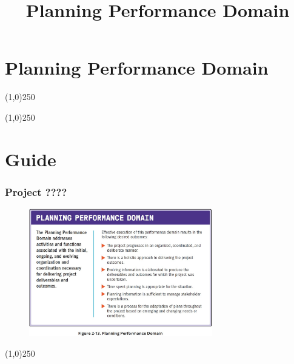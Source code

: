 



%
\title[Project Management \& BIM]{Planning Performance Domain}



%
\usetikzlibrary{arrows}



\newpage




\thispagestyle{empty}
\tableofcontents
\newpage
\section{Planning Performance Domain}


\begin{frame}
\titlepage
\end{frame}\begin{center}\line(1,0){250}\end{center}
%
%
\begin{center}\line(1,0){250}\end{center}







\section{Guide}


\begin{frame}
\frametitle{Project ????}
 \begin{figure}
    \centering
        \includegraphics[width = 8cm]{../images/guide/Fig2-13.jpg}
    \label{guidefig:2-13}
 \end{figure}
\end{frame}
\begin{center}\line(1,0){250}\end{center}

